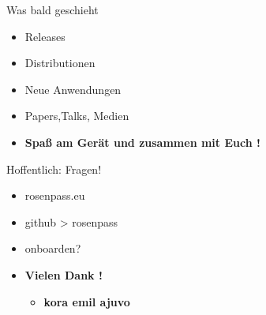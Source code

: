 \documentclass{rosenpass-beamer}
\begin{document}
	\begin{frame}{Was bald geschieht}
		\begin{itemize}
			\item Releases
			\item Distributionen
			\item Neue Anwendungen
			\item Papers,Talks, Medien
		\end{itemize}
	
		\begin{itemize}
			\item \textbf{Spaß am Gerät und zusammen mit Euch !}
		\end{itemize}
	\end{frame}	


	\begin{frame}{Hoffentlich: Fragen!}
		\begin{itemize}
			\item rosenpass.eu
			\item github > rosenpass
			\item onboarden?
		\end{itemize}
	
		\begin{itemize}
			\item \textbf{Vielen Dank !}
			\begin{itemize}
				\item \textbf{kora   emil   ajuvo}
			\end{itemize}	
		\end{itemize}
	\end{frame}	
\end{document}
